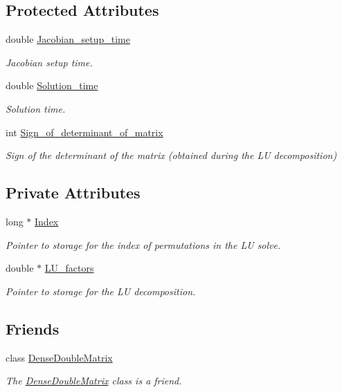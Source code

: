 \subsection*{Protected Attributes}
\begin{DoxyCompactItemize}
\item 
double \hyperlink{classoomph_1_1DenseLU_a3618b27ae286e468251f52091ddf1e70}{Jacobian\+\_\+setup\+\_\+time}
\begin{DoxyCompactList}\small\item\em Jacobian setup time. \end{DoxyCompactList}\item 
double \hyperlink{classoomph_1_1DenseLU_abd10caf6beabb9c81fb7a8072212c6ad}{Solution\+\_\+time}
\begin{DoxyCompactList}\small\item\em Solution time. \end{DoxyCompactList}\item 
int \hyperlink{classoomph_1_1DenseLU_aea4118f8ead9e3f89f8d234f572766d1}{Sign\+\_\+of\+\_\+determinant\+\_\+of\+\_\+matrix}
\begin{DoxyCompactList}\small\item\em Sign of the determinant of the matrix (obtained during the LU decomposition) \end{DoxyCompactList}\end{DoxyCompactItemize}
\subsection*{Private Attributes}
\begin{DoxyCompactItemize}
\item 
long $\ast$ \hyperlink{classoomph_1_1DenseLU_a66730f6a64112fe29601fefb08f4dc4f}{Index}
\begin{DoxyCompactList}\small\item\em Pointer to storage for the index of permutations in the LU solve. \end{DoxyCompactList}\item 
double $\ast$ \hyperlink{classoomph_1_1DenseLU_a9b393b33667887cfdafa6290c7b3e209}{L\+U\+\_\+factors}
\begin{DoxyCompactList}\small\item\em Pointer to storage for the LU decomposition. \end{DoxyCompactList}\end{DoxyCompactItemize}
\subsection*{Friends}
\begin{DoxyCompactItemize}
\item 
class \hyperlink{classoomph_1_1DenseLU_a6140531810d729d53113b6ac65193197}{Dense\+Double\+Matrix}
\begin{DoxyCompactList}\small\item\em The \hyperlink{classoomph_1_1DenseDoubleMatrix}{Dense\+Double\+Matrix} class is a friend. \end{DoxyCompactList}\end{DoxyCompactItemize}


